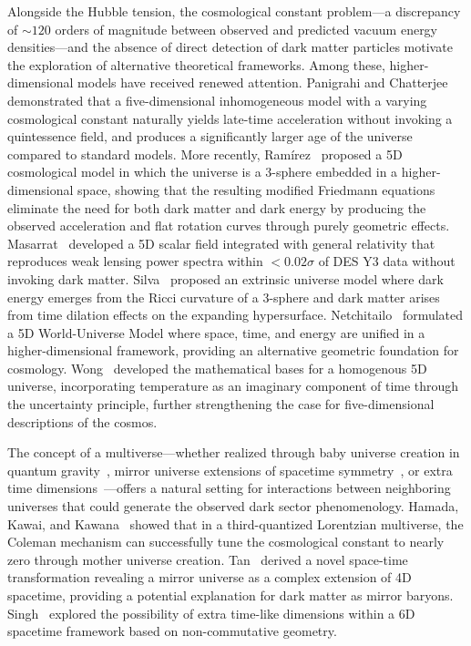 \documentclass[12pt]{article}
\begin{document}
Alongside the Hubble tension, the cosmological constant problem---a discrepancy of $\sim 120$ orders of magnitude between observed and predicted vacuum energy densities---and the absence of direct detection of dark matter particles motivate the exploration of alternative theoretical frameworks. Among these, higher-dimensional models have received renewed attention. Panigrahi and Chatterjee~\cite{panigrahi2007} demonstrated that a five-dimensional inhomogeneous model with a varying cosmological constant naturally yields late-time acceleration without invoking a quintessence field, and produces a significantly larger age of the universe compared to standard models. More recently, Ram\'irez~\cite{ramirez2025} proposed a 5D cosmological model in which the universe is a 3-sphere embedded in a higher-dimensional space, showing that the resulting modified Friedmann equations eliminate the need for both dark matter and dark energy by producing the observed acceleration and flat rotation curves through purely geometric effects. Masarrat~\cite{masarrat2025} developed a 5D scalar field integrated with general relativity that reproduces weak lensing power spectra within $<0.02\sigma$ of DES Y3 data without invoking dark matter. Silva~\cite{silva2024} proposed an extrinsic universe model where dark energy emerges from the Ricci curvature of a 3-sphere and dark matter arises from time dilation effects on the expanding hypersurface. Netchitailo~\cite{netchitailo2015} formulated a 5D World-Universe Model where space, time, and energy are unified in a higher-dimensional framework, providing an alternative geometric foundation for cosmology. Wong~\cite{wong2024} developed the mathematical bases for a homogenous 5D universe, incorporating temperature as an imaginary component of time through the uncertainty principle, further strengthening the case for five-dimensional descriptions of the cosmos.

The concept of a multiverse---whether realized through baby universe creation in quantum gravity~\cite{hamada2022}, mirror universe extensions of spacetime symmetry~\cite{tan}, or extra time dimensions~\cite{singh2025}---offers a natural setting for interactions between neighboring universes that could generate the observed dark sector phenomenology. Hamada, Kawai, and Kawana~\cite{hamada2022} showed that in a third-quantized Lorentzian multiverse, the Coleman mechanism can successfully tune the cosmological constant to nearly zero through mother universe creation. Tan~\cite{tan} derived a novel space-time transformation revealing a mirror universe as a complex extension of 4D spacetime, providing a potential explanation for dark matter as mirror baryons. Singh~\cite{singh2025} explored the possibility of extra time-like dimensions within a 6D spacetime framework based on non-commutative geometry.
\end{document}
